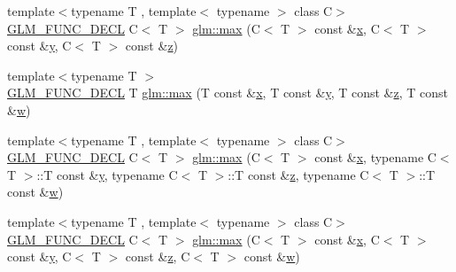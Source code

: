 \begin{DoxyCompactItemize}
\item 
{\footnotesize template$<$typename T , template$<$ typename $>$ class C$>$ }\\\hyperlink{setup_8hpp_ab2d052de21a70539923e9bcbf6e83a51}{G\+L\+M\+\_\+\+F\+U\+N\+C\+\_\+\+D\+E\+CL} C$<$ T $>$ \hyperlink{group__gtx__extended__min__max_gaf832e9d4ab4826b2dda2fda25935a3a4}{glm\+::max} (C$<$ T $>$ const \&\hyperlink{_s_d_l__opengl_8h_ad0e63d0edcdbd3d79554076bf309fd47}{x}, C$<$ T $>$ const \&\hyperlink{_s_d_l__opengl_8h_a1675d9d7bb68e1657ff028643b4037e3}{y}, C$<$ T $>$ const \&\hyperlink{_s_d_l__opengl__glext_8h_a5e74030ebb3297ce1b37ff716fedd68f}{z})
\item 
{\footnotesize template$<$typename T $>$ }\\\hyperlink{setup_8hpp_ab2d052de21a70539923e9bcbf6e83a51}{G\+L\+M\+\_\+\+F\+U\+N\+C\+\_\+\+D\+E\+CL} T \hyperlink{group__gtx__extended__min__max_ga78e04a0cef1c4863fcae1a2130500d87}{glm\+::max} (T const \&\hyperlink{_s_d_l__opengl_8h_ad0e63d0edcdbd3d79554076bf309fd47}{x}, T const \&\hyperlink{_s_d_l__opengl_8h_a1675d9d7bb68e1657ff028643b4037e3}{y}, T const \&\hyperlink{_s_d_l__opengl__glext_8h_a5e74030ebb3297ce1b37ff716fedd68f}{z}, T const \&\hyperlink{_s_d_l__opengl__glext_8h_a6ee8f168a7ab6785a9bb57c6715dad99}{w})
\item 
{\footnotesize template$<$typename T , template$<$ typename $>$ class C$>$ }\\\hyperlink{setup_8hpp_ab2d052de21a70539923e9bcbf6e83a51}{G\+L\+M\+\_\+\+F\+U\+N\+C\+\_\+\+D\+E\+CL} C$<$ T $>$ \hyperlink{group__gtx__extended__min__max_ga7cca8b53cfda402040494cdf40fbdf4a}{glm\+::max} (C$<$ T $>$ const \&\hyperlink{_s_d_l__opengl_8h_ad0e63d0edcdbd3d79554076bf309fd47}{x}, typename C$<$ T $>$\+::T const \&\hyperlink{_s_d_l__opengl_8h_a1675d9d7bb68e1657ff028643b4037e3}{y}, typename C$<$ T $>$\+::T const \&\hyperlink{_s_d_l__opengl__glext_8h_a5e74030ebb3297ce1b37ff716fedd68f}{z}, typename C$<$ T $>$\+::T const \&\hyperlink{_s_d_l__opengl__glext_8h_a6ee8f168a7ab6785a9bb57c6715dad99}{w})
\item 
{\footnotesize template$<$typename T , template$<$ typename $>$ class C$>$ }\\\hyperlink{setup_8hpp_ab2d052de21a70539923e9bcbf6e83a51}{G\+L\+M\+\_\+\+F\+U\+N\+C\+\_\+\+D\+E\+CL} C$<$ T $>$ \hyperlink{group__gtx__extended__min__max_gaacffbc466c2d08c140b181e7fd8a4858}{glm\+::max} (C$<$ T $>$ const \&\hyperlink{_s_d_l__opengl_8h_ad0e63d0edcdbd3d79554076bf309fd47}{x}, C$<$ T $>$ const \&\hyperlink{_s_d_l__opengl_8h_a1675d9d7bb68e1657ff028643b4037e3}{y}, C$<$ T $>$ const \&\hyperlink{_s_d_l__opengl__glext_8h_a5e74030ebb3297ce1b37ff716fedd68f}{z}, C$<$ T $>$ const \&\hyperlink{_s_d_l__opengl__glext_8h_a6ee8f168a7ab6785a9bb57c6715dad99}{w})

\end{DoxyCompactItemize}
